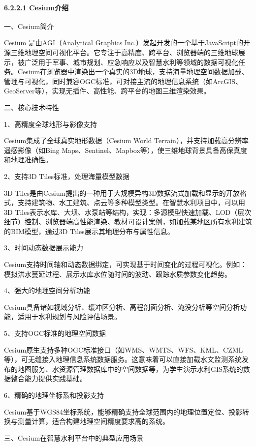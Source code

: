 \paragraph{6.2.2.1 Cesium介绍}\label{cesiumux4ecbux7ecd}

一、Cesium简介

Cesium 是由AGI（Analytical Graphics Inc.）发起开发的一个基于JavaScript的开源三维地理空间可视化平台。它专注于高精度、跨平台、浏览器端的三维地球展示，被广泛用于军事、城市规划、应急响应以及智慧水利等领域的数据可视化任务。Cesium在浏览器中渲染出一个真实的3D地球，支持海量地理空间数据加载、管理与可视化，同时兼容OGC标准，可对接主流的地理信息系统（如ArcGIS、GeoServer等），实现无插件、高性能、跨平台的地图三维渲染效果。

二、核心技术特性

1、高精度全球地形与影像支持

Cesium集成了全球真实地形数据（Cesium World Terrain），并支持加载高分辨率遥感影像（如Bing Maps、Sentinel、Mapbox等），使三维地球背景具备高保真度和地理准确性。

2、支持3D Tiles标准，处理海量模型数据

3D Tiles是由Cesium提出的一种用于大规模异构3D数据流式加载和显示的开放格式，支持建筑物、水工建筑、点云等多种模型类型。在智慧水利项目中，可以用3D Tiles表示水库、大坝、水泵站等结构，实现：多源模型快速加载、LOD（层次细节）控制、浏览器端高性能渲染、教材可设计案例，如加载某地区所有水利建筑的BIM模型，通过3D Tiles展示其地理分布与属性信息。

3、时间动态数据展示能力

Cesium支持时间轴和动态数据绑定，可实现基于时间变化的过程可视化。例如：模拟洪水蔓延过程、展示水库水位随时间的波动、跟踪水质参数变化趋势。

4、强大的地理空间分析功能

Cesium具备诸如视域分析、缓冲区分析、高程剖面分析、淹没分析等空间分析功能，适用于水利规划与风险评估场景。

5、支持OGC标准的地理空间数据

Cesium原生支持多种OGC标准接口（如WMS、WMTS、WFS、KML、CZML等），可无缝接入地理信息系统数据服务。这意味着可以直接加载水文监测系统发布的地图服务、水资源管理数据库中的空间数据等，为学生演示水利GIS系统的数据整合能力提供实践基础。

6、精确的地理坐标系和投影支持

Cesium基于WGS84坐标系统，能够精确支持全球范围内的地理位置定位、投影转换与测量计算，适合构建地理空间精度要求高的系统。

三、Cesium在智慧水利平台中的典型应用场景

